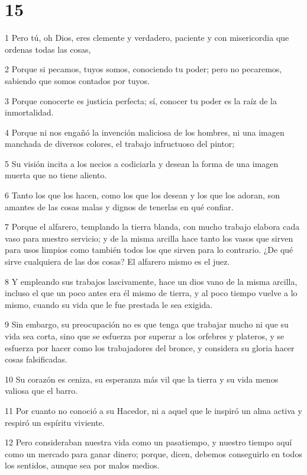\chapter{15}

\par 1 Pero tú, oh Dios, eres clemente y verdadero, paciente y con misericordia que ordenas todas las cosas,
\par 2 Porque si pecamos, tuyos somos, conociendo tu poder; pero no pecaremos, sabiendo que somos contados por tuyos.
\par 3 Porque conocerte es justicia perfecta; sí, conocer tu poder es la raíz de la inmortalidad.
\par 4 Porque ni nos engañó la invención maliciosa de los hombres, ni una imagen manchada de diversos colores, el trabajo infructuoso del pintor;
\par 5 Su visión incita a los necios a codiciarla y desean la forma de una imagen muerta que no tiene aliento.
\par 6 Tanto los que los hacen, como los que los desean y los que los adoran, son amantes de las cosas malas y dignos de tenerlas en qué confiar.
\par 7 Porque el alfarero, templando la tierra blanda, con mucho trabajo elabora cada vaso para nuestro servicio; y de la misma arcilla hace tanto los vasos que sirven para usos limpios como también todos los que sirven para lo contrario. ¿De qué sirve cualquiera de las dos cosas? El alfarero mismo es el juez.
\par 8 Y empleando sus trabajos lascivamente, hace un dios vano de la misma arcilla, incluso el que un poco antes era él mismo de tierra, y al poco tiempo vuelve a lo mismo, cuando su vida que le fue prestada le sea exigida.
\par 9 Sin embargo, su preocupación no es que tenga que trabajar mucho ni que su vida sea corta, sino que se esfuerza por superar a los orfebres y plateros, y se esfuerza por hacer como los trabajadores del bronce, y considera su gloria hacer cosas falsificadas.
\par 10 Su corazón es ceniza, su esperanza más vil que la tierra y su vida menos valiosa que el barro.
\par 11 Por cuanto no conoció a su Hacedor, ni a aquel que le inspiró un alma activa y respiró un espíritu viviente.
\par 12 Pero consideraban nuestra vida como un pasatiempo, y nuestro tiempo aquí como un mercado para ganar dinero; porque, dicen, debemos conseguirlo en todos los sentidos, aunque sea por malos medios.
